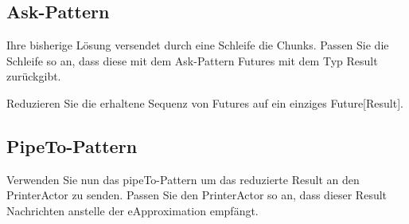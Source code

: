 \documentclass[11pt]{tudexercise}
\begin{document}
\subsection{Ask-Pattern}
Ihre bisherige Lösung versendet durch eine Schleife die Chunks. Passen Sie die Schleife so an, dass diese mit dem Ask-Pattern Futures mit dem Typ Result zurückgibt.

Reduzieren Sie die erhaltene Sequenz von Futures auf ein einziges Future[Result].

\subsection{PipeTo-Pattern}
Verwenden Sie nun das pipeTo-Pattern um das reduzierte Result an den PrinterActor zu senden. Passen Sie den PrinterActor so an, dass dieser Result Nachrichten anstelle der eApproximation empfängt.
\end{document}
